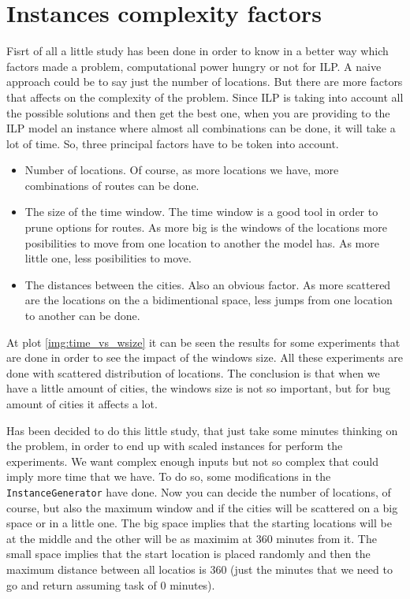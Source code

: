 \documentclass[]{report}
\begin{document}
\section{Instances complexity factors}\label{s:complexity_factors}

Fisrt of all a little study has been done in order to know in a better way which factors made a problem, computational power hungry or not for ILP. A naive approach could be to say just the number of locations. But there are more factors that affects on the complexity of the problem. Since ILP is taking into account all the possible solutions and then get the best one, when you are providing to the ILP model an instance where almost all combinations can be done, it will take a lot of time. So, three principal factors have to be token into account.

\begin{itemize}
	\item Number of locations. Of course, as more locations we have, more combinations of routes can be done.
	\item The size of the time window. The time window is a good tool in order to prune options for routes. As more big is the windows of the locations more posibilities to move from one location to another the model has. As more little one, less posibilities to move.
	\item The distances between the cities. Also an obvious factor. As more scattered are the locations on the a bidimentional space, less jumps from one location to another can be done.
\end{itemize}

At plot \ref{img:time_vs_wsize} it can be seen the results for some experiments that are done in order to see the impact of the windows size. All these experiments are done with scattered distribution of locations. The conclusion is that when we have a little amount of cities, the windows size is not so important, but for bug amount of cities it affects a lot.

Has been decided to do this little study, that just take some minutes thinking on the problem, in order to end up with scaled instances for perform the experiments. We want complex enough inputs but not so complex that could imply more time that we have. To do so, some modifications in the {\tt InstanceGenerator} have done. Now you can decide the number of locations, of course, but also the maximum window and if the cities will be scattered on a big space or in a little one. The big space implies that the starting locations will be at the middle and the other will be as maximim at 360 minutes from it. The small space implies that the start location is placed randomly and then the maximum distance between all locatios is 360 (just the minutes that we need to go and return assuming task of 0 minutes).
\end{document}

